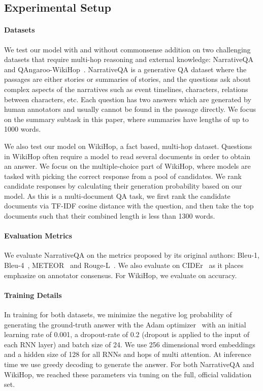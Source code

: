 \documentclass[11pt,a4paper]{article}
\begin{document}
\subsection{Experimental Setup}
\paragraph{Datasets}
We test our model with and without commonsense addition on two challenging datasets that require multi-hop reasoning and external knowledge: NarrativeQA~\cite{kovcisky2017narrativeqa} and QAngaroo-WikiHop~\cite{welbl2017constructing}. 
NarrativeQA is a generative QA dataset where the passages are either stories or summaries of stories, and the questions ask about complex aspects of the narratives such as event timelines, characters, relations between characters, etc.
Each question has two answers which are generated by human annotators and usually cannot be found in the passage directly.
We focus on the summary subtask in this paper, where summaries have lengths of up to 1000 words.


We also test our model on WikiHop, a fact based, multi-hop dataset.
Questions in WikiHop often require a model to read several documents in order to obtain an answer.
We focus on the multiple-choice part of WikiHop, where models are tasked with picking the correct response from a pool of candidates.
We rank candidate responses by calculating their generation probability based on our model.
As this is a multi-document QA task, we first rank the candidate documents via TF-IDF cosine distance with the question, and then take the top  documents such that their combined length is less than 1300 words.

\paragraph{Evaluation Metrics}
We evaluate NarrativeQA on the metrics proposed by its original authors: Bleu-1, Bleu-4~\cite{papineni2002bleu}, METEOR~\cite{banerjee2005meteor} and Rouge-L~\cite{lin2004rouge}.
We also evaluate on CIDEr~\cite{vedantam2015cider} as it places emphasize on annotator consensus.
For WikiHop, we evaluate on accuracy.


\paragraph{Training Details}
In training for both datasets, we minimize the negative log probability of generating the ground-truth answer with the Adam optimizer~\cite{kingma2014adam} with an initial learning rate of 0.001, a dropout-rate of 0.2 (dropout is applied to the input of each RNN layer) and batch size of 24. We use 256 dimensional word embeddings and a hidden size of 128 for all RNNs and  hops of multi attention. At inference time we use greedy decoding to generate the answer.
For both NarrativeQA and WikiHop, we reached these parameters via tuning on the full, official validation set.
\end{document}
